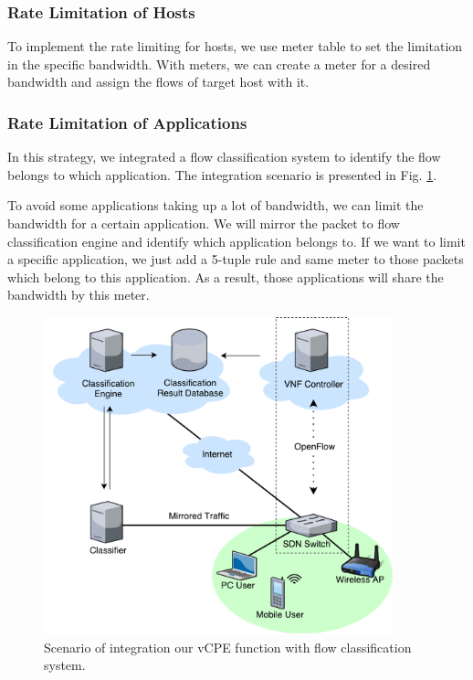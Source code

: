 \subsubsection{Rate Limitation of Hosts}

To implement the rate limiting for hosts, we use meter table to set the limitation in the specific bandwidth.
With meters, we can create a meter for a desired bandwidth and assign the flows of target host with it.

\subsubsection{Rate Limitation of Applications}
In this strategy, we integrated a flow classification system to identify the flow belongs to which application.  The integration scenario is presented in Fig. \ref{fig:class_classifying}.

To avoid some applications taking up a lot of bandwidth, we can limit the bandwidth for a certain application. We will mirror the packet to flow classification engine and identify which application belongs to. If we want to limit a specific application, we just add a 5-tuple rule and same meter to those packets which belong to this application. As a result, those applications will share the bandwidth by this meter.


\begin{figure}[!t]
\centering
\includegraphics[width=0.9\textwidth]{./fig/classification_classifying}
\caption{Scenario of integration our vCPE function with flow classification system.}
\label{fig:class_classifying}
\end{figure}

